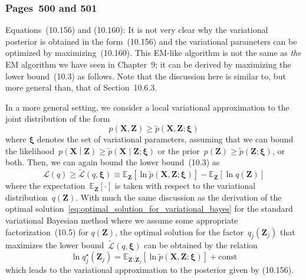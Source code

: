 \documentclass[12pt,a4paper]{article}
\newcommand{\erratum}[1]{%
\subsubsection*{#1}
\addcontentsline{toc}{subsection}{#1}}
\begin{document}
\erratum{Pages~500 and 501}
Equations~(10.156) and (10.160):
It is not very clear why the variational posterior is obtained in the form~(10.156) and
the variational parameters can be optimized by maximizing~(10.160).
This EM-like algorithm is not the same as \emph{the} EM algorithm we have seen in Chapter~9;
it can be derived by maximizing the lower bound~(10.3) as follows.
Note that the discussion here is similar to, but more general than, that of Section~10.6.3.

In a more general setting, we consider a local variational approximation to
the joint distribution of the form
\begin{equation}
p\left(\mathbf{X}, \mathbf{Z}\right) \geqslant
\widetilde{p}\left(\mathbf{X}, \mathbf{Z}; \bm{\xi} \right)
\end{equation}
where $\bm{\xi}$ denotes the set of variational parameters,
assuming that we can bound the likelihood~$p\left(\mathbf{X} \middle| \mathbf{Z}\right) \geqslant
\widetilde{p}\left(\mathbf{X} \middle| \mathbf{Z}; \bm{\xi} \right)$
or the prior~$p\left(\mathbf{Z}\right) \geqslant
\widetilde{p}\left(\mathbf{Z}; \bm{\xi} \right)$, or both.
Then, we can again bound the lower bound~(10.3) as
\begin{equation}
\mathcal{L}(q) \geqslant
\widetilde{\mathcal{L}}(q, \bm{\xi}) \equiv
\mathbb{E}_{\mathbf{Z}}\left[\ln \widetilde{p}\left(\mathbf{X}, \mathbf{Z}; \bm{\xi}\right)\right]
- \mathbb{E}_{\mathbf{Z}}\left[\ln q\left(\mathbf{Z}\right)\right]
\label{eq:bound_of_lower_bound}
\end{equation}
where the expectation~$\mathbb{E}_{\mathbf{Z}}[\cdot]$ is taken with respect to
the variational distribution~$q(\mathbf{Z})$.
With much the same discussion as the derivation of
the optimal solution~\eqref{eq:optimal_solution_for_variational_bayes}
for the standard variational Bayesian method
where we assume some appropriate factorization~(10.5) for $q(\mathbf{Z})$,
the optimal solution for the factor~$q_j(\mathbf{Z}_j)$ that maximizes
the lower bound~$\widetilde{\mathcal{L}}(q, \bm{\xi})$ can be obtained by the relation
\begin{equation}
\ln q_j^{\star}\left(\mathbf{Z}_j\right) =
\mathbb{E}_{\mathbf{Z}\setminus\mathbf{Z}_j}
\left[ \ln \widetilde{p}\left(\mathbf{X}, \mathbf{Z}; \bm{\xi}\right) \right] +
\text{const}
\label{eq:optimal_solution_for_local_variational_bayes}
\end{equation}
which leads to the variational approximation to the posterior given by (10.156).
\end{document}
